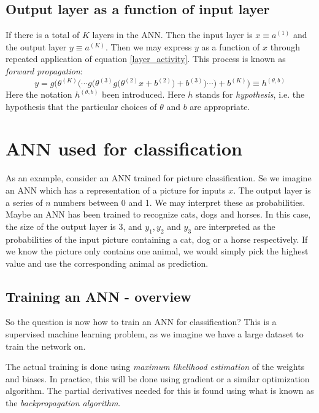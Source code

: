 \documentclass[12pt, a4paper]{article}
\numberwithin{equation}{section}
\begin{document}
\subsection{Output layer as a function of input layer}
If there is a total of $K$ layers in the ANN. Then the input layer is $x\equiv a^{(1)}$ and the output layer $y\equiv a^{(K)}$. Then we may express $y$ as a function of $x$ through repeated application of equation \ref{layer_activity}. This process is known as \textit{forward propagation}:
\begin{equation}
\label{hypothesis}
y=g\Bigg(\theta^{(K)}\bigg(\cdots g\Big(\theta^{(3)} g\big(\theta^{(2)}x+b^{(2)}\big)+b^{(3)}\Big)\cdots\bigg)+b^{(K)}\Bigg)\equiv h^{(\theta,b)}
\end{equation}
Here the notation $h^{(\theta,b)}$ been introduced. Here $h$ stands for \textit{hypothesis}, i.e. the hypothesis that the particular choices of $\theta$ and $b$ are appropriate.

\section{ANN used for classification}
As an example, consider an ANN trained for picture classification. Se we imagine an ANN which has a representation of a picture for inputs $x$. The output layer is a series of $n$ numbers between 0 and 1. We may interpret these as probabilities. Maybe an ANN has been trained to recognize cats, dogs and horses. In this case, the size of the output layer is 3, and $y_1, y_2$ and $y_3$ are interpreted as the probabilities of the input picture containing a cat, dog or a horse respectively. If we know the picture only contains one animal, we would simply pick the highest value and use the corresponding animal as prediction.

\subsection{Training an ANN - overview}
So the question is now how to train an ANN for classification? This is a supervised machine learning problem, as we imagine we have a large dataset to train the network on.

The actual training is done using \textit{maximum likelihood estimation} of the weights and biases. In practice, this will be done using gradient or a similar optimization algorithm. The partial derivatives needed for this is found using what is known as the \textit{backpropagation algorithm}.
\end{document}
